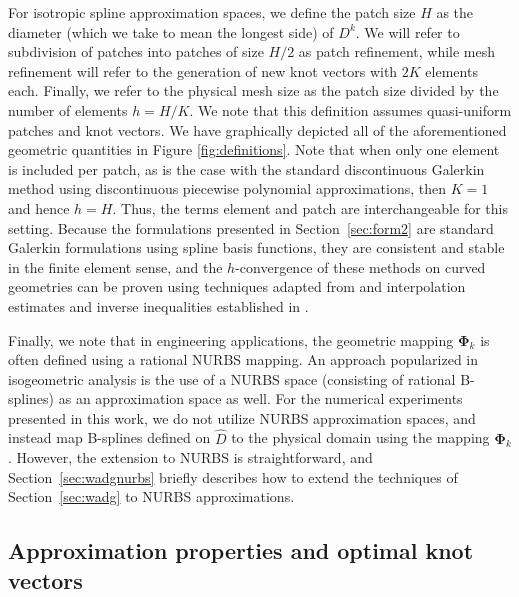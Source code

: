 \documentclass[preprint,10pt]{elsarticle}
\newcommand{\Dhat}{\widehat{D}}
\newcommand{\reviewerTwo}[1]{#1}
\begin{document}
For isotropic spline approximation spaces, we define the patch size $H$ as the diameter {\color{forestgreen}(which we take to mean the longest side)} of $D^k$.  We will refer to subdivision of patches into patches of size $H/2$ as patch refinement, while mesh refinement will refer to the generation of new knot vectors with $2K$ elements each. Finally, we refer to the physical mesh size as the patch size divided by the number of elements $h = H/K$.  We note that this definition assumes quasi-uniform patches and knot vectors.  {\color{forestgreen} We have graphically depicted all of the aforementioned geometric quantities in Figure \ref{fig:definitions}. Note that when only one element is included per patch, as is the case with the standard discontinuous Galerkin method using discontinuous piecewise polynomial approximations, then $K = 1$ and hence $h = H$.  Thus, the terms element and patch are interchangeable for this setting.}  Because the formulations presented in Section~\ref{sec:form2} are standard Galerkin formulations using spline basis functions, they are consistent and stable in the finite element sense, and the $h$-convergence of these methods on curved geometries can be proven using techniques adapted from \cite{warburton2013low} and interpolation estimates and inverse inequalities established in \cite{bazilevs2006isogeometric, evans2013explicit}.

Finally, we note that in engineering applications, the geometric mapping $\bm{\Phi}_k$ is often defined using a rational NURBS mapping.  An approach popularized in isogeometric analysis is the use of a NURBS space (consisting of rational B-splines) as an approximation space as well.  For the numerical experiments presented in this work, we do not utilize NURBS approximation spaces, and instead map B-splines defined on $\Dhat$ to the physical domain using the mapping $\bm{\Phi}_k$.  \reviewerTwo{However, the extension to NURBS is straightforward, and Section~\ref{sec:wadgnurbs} briefly describes how to extend the techniques of Section~\ref{sec:wadg} to NURBS approximations.}


\subsection{Approximation properties and optimal knot vectors}
\end{document}
